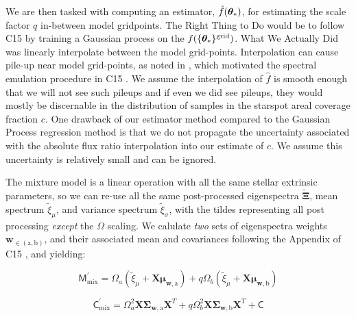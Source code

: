 \documentclass[twocolumn]{emulateapj}%
\newcommand{\iancze}{{\sc C15 }}
\begin{document}
We are then tasked with computing an estimator, $\hat f({\bm \theta}_{\ast})$, for estimating the scale factor $q$ in-between model gridpoints.  The Right Thing to Do would be to follow \iancze by training a Gaussian process on the $f(\{{\bm \theta}_{\ast}\}^\textrm{grid})$.  What We Actually Did was linearly interpolate between the model grid-points.  Interpolation can cause pile-up near model grid-points, as noted in \citet{cottaar14}, which motivated the spectral emulation procedure in \iancze.  We assume the interpolation of $\hat f$ is smooth enough that we will not see such pileups and if even we did see pileups, they would mostly be discernable in the distribution of samples in the starspot areal coverage fraction $c$.  One drawback of our estimator method compared to the Gaussian Process regression method is that we do not propagate the uncertainty associated with the absolute flux ratio interpolation into our estimate of $c$.  We assume this uncertainty is relatively small and can be ignored.

The mixture model is a linear operation with all the same stellar extrinsic parameters, so we can re-use all the same post-processed eigenspectra $\widetilde{\mathbf{\Xi}}$, mean spectrum $\widetilde{\xi}_\mu$, and variance spectrum $\widetilde{\xi}_\sigma$, with the tildes representing all post processing \emph{except} the $\Omega$ scaling.  We calulate \emph{two} sets of eigenspectra weights $\mathbf{w}_{\in (\mathrm{a}, \mathrm{b})}$, and their associated mean and covariances following the Appendix of \iancze, and yielding:

\begin{equation}
  \mathsf{M}_{\mathrm{mix}}^\prime = \Omega_a (\widetilde{\xi}_\mu + \mathbf{X} \mathbf{\mu}_{\mathbf{w}, \mathrm{a}}) + q \Omega_b (\widetilde{\xi}_\mu + \mathbf{X} \mathbf{\mu}_{\mathbf{w}, \mathrm{b}})
\end{equation}

\begin{equation}
  \mathsf{C}_{\mathrm{mix}}^\prime = \Omega_a^2 \mathbf{X} \mathbf{\Sigma}_\mathbf{w, \mathrm{a}} \mathbf{X}^T + q \Omega_b^2 \mathbf{X} \mathbf{\Sigma}_\mathbf{w, \mathrm{b}} \mathbf{X}^T + \mathsf{C}
  \label{eqn:modC}
\end{equation}
\end{document}
